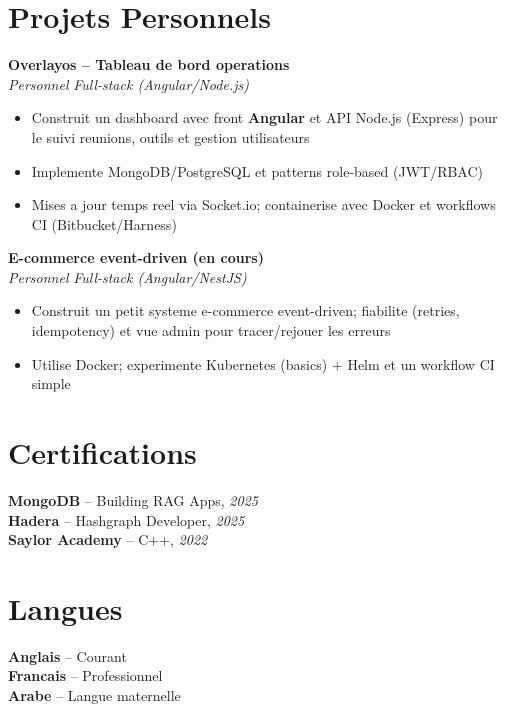\documentclass[10pt,a4paper]{article}
\begin{document}
\vspace{4pt}
\section*{Projets Personnels}
{\small
\textbf{Overlayos -- Tableau de bord operations}\\[1pt]
\textit{Personnel} \hfill \textit{Full-stack (Angular/Node.js)}
\begin{itemize}
  \item Construit un dashboard avec front \textbf{Angular} et API Node.js (Express) pour le suivi reunions, outils et gestion utilisateurs
  \item Implemente MongoDB/PostgreSQL et patterns role-based (JWT/RBAC)
  \item Mises a jour temps reel via Socket.io; containerise avec Docker et workflows CI (Bitbucket/Harness)
\end{itemize}

\vspace{2pt}
\textbf{E-commerce event-driven (en cours)}\\[1pt]
\textit{Personnel} \hfill \textit{Full-stack (Angular/NestJS)}
\begin{itemize}
  \item Construit un petit systeme e-commerce event-driven; fiabilite (retries, idempotency) et vue admin pour tracer/rejouer les erreurs
  \item Utilise Docker; experimente Kubernetes (basics) + Helm et un workflow CI simple
\end{itemize}
}

\vspace{3pt}
\section*{Certifications}
{\small
\textbf{MongoDB} -- Building RAG Apps, \textit{2025}\\[1pt]
\textbf{Hadera} -- Hashgraph Developer, \textit{2025}\\[1pt]
\textbf{Saylor Academy} -- C++, \textit{2022}
}

\section*{Langues}
{\small
\textbf{Anglais} -- Courant\\[1pt]
\textbf{Francais} -- Professionnel\\[1pt]
\textbf{Arabe} -- Langue maternelle
}
\end{document}
